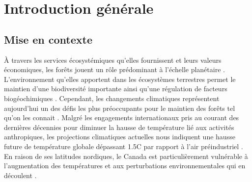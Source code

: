 \chapter*{Introduction générale}         %
\label{chap-introduction}       %


\section*{Mise en contexte}
\label{sec:contexte}
À travers les services écosystémiques qu'elles fournissent et leurs valeurs économiques, les forêts jouent un rôle prédominant à l'échelle planétaire \citep{Balvanera2006Quantifyingevidence}.
L'environnement qu'elles apportent dans les écosystèmes terrestres permet le maintien d’une biodiversité importante ainsi qu'une régulation de facteurs biogéochimiques \citep{Pawson2013Plantationforests}. 
Cependant, les changements climatiques représentent aujourd'hui un des défis les plus préoccupants pour le maintien des forêts tel qu'on les connait \citep{McKenney2009Climatechange,Messier2022Warningnatural,Seidl2017Forestdisturbances,Trumbore2015Foresthealth}.  
Malgré les engagements internationaux pris au courant des dernières décennies pour diminuer la hausse de température lié aux activités anthropiques, 
les projections climatiques actuelles nous indiquent une hausse future de température globale dépassant 1.5C par rapport à l'air préindustriel \citep{Matthews2022Currentglobal}.
En raison de ses latitudes nordiques, le Canada est particulièrement vulnérable à l'augmentation des températures et aux perturbations environnementales qui en découlent \citep{Alo2008Potentialfuture,Bush2019Canadachanging}. 

